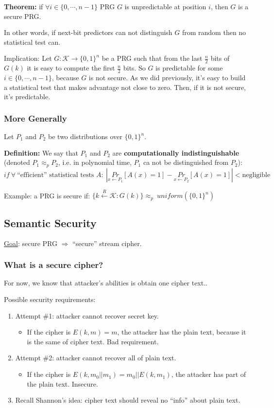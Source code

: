 \documentclass[12pt]{book}
\newcommand{\Thm}{\textbf{Theorem:} }
\newcommand{\Def}{\textcolor{dkgreen}{\textbf{Definition:}} }
\begin{document}
\Thm if $\forall i\in\{0,\cdots,n-1\}$ PRG $G$ is unpredictable at position $i$, then $G$ is a secure PRG.

In other words, if next-bit predictors can not distinguish $G$ from random then no statistical test can.

Implication: Let $G:\mathcal{K}\rightarrow\{0,1\}^{n}$ be a PRG such that from the last $\frac{n}{2}$ bits of $G(k)$ it is easy to compute the first $\frac{n}{2}$ bits. So $G$ is predictable for some $i\in\{0,\cdots,n-1\}$, because $G$ is not secure. As we did previously, it's easy to build a statistical test that makes advantage not close to zero. Then, if it is not secure, it's predictable.

\subsubsection{More Generally}
Let $P_{1}$ and $P_{2}$ be two distributions over $\{0,1\}^{n}$.

\Def We say that $P_{1}$ and $P_{2}$ are \textbf{computationally indistinguishable} (denoted $P_{1}\approx_{p}P_{2}$, i.e. in polynomial time, $P_{1}$ ca not be distinguished from $P_{2}$):
$$if\ \forall\ \text{``efficient'' statistical tests }A:\ \left|\underset{x\leftarrow P_{1}}{Pr}[A(x)=1]-\underset{x\leftarrow P_{2}}{Pr}[A(x)=1]\right|<\text{negligible}$$

Example: a PRG is secure if: $\{k\xleftarrow{R}\mathcal{K}:G(k)\}\approx_{p}\ uniform(\{0,1\}^{n})$

\subsection{Semantic Security}
\underline{Goal}: secure PRG $\Rightarrow$ ``secure'' stream cipher.
\subsubsection{What is a secure cipher?}
For now, we know that attacker's abilities is obtain one cipher text..

Possible security requirements:
\begin{enumerate}
	\item[] Attempt \#1: attacker cannot recover secret key.
	\begin{itemize}
		\item If the cipher is $E(k,m)=m$, the attacker has the plain text, because it is the same of cipher text. Bad requirement.
	\end{itemize}
	\item[] Attempt \#2: attacker cannot recover all of plain text.
	\begin{itemize}
		\item If the cipher is $E(k,m_{0}||m_{1})=m_{0}||E(k,m_{1})$, the attacker has part of the plain text. Insecure.
	\end{itemize}
	\item[] Recall Shannon's idea: cipher text should reveal no ``info'' about plain text.
\end{enumerate}
\end{document}
